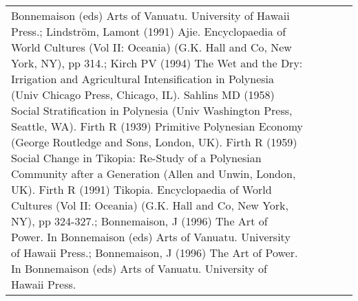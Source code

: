 \begin{longtable}{p{2cm}p{2cm}p{2cm}p{5cm}p{7cm}}
Bonnemaison (eds) Arts of Vanuatu. University of Hawaii Press.; Lindström, Lamont (1991) Ajie. Encyclopaedia of World Cultures (Vol II: Oceania) (G.K. Hall and Co, New York, NY), pp 314.; Kirch PV (1994) The Wet and the Dry: Irrigation and Agricultural Intensification in Polynesia (Univ Chicago Press, Chicago, IL). Sahlins MD (1958) Social Stratification in Polynesia (Univ Washington Press, Seattle, WA). Firth R (1939) Primitive Polynesian Economy (George Routledge and Sons, London, UK). Firth R (1959) Social Change in Tikopia: Re-Study of a Polynesian Community after a Generation (Allen and Unwin, London, UK). Firth R (1991) Tikopia. Encyclopaedia of World Cultures (Vol II: Oceania) (G.K. Hall and Co, New York, NY), pp 324-327.; Bonnemaison, J (1996) The Art of Power. In Bonnemaison (eds) Arts of Vanuatu. University of Hawaii Press.; Bonnemaison, J (1996) The Art of Power. In Bonnemaison (eds) Arts of Vanuatu. University of Hawaii Press. \\ 

\end{longtable}
